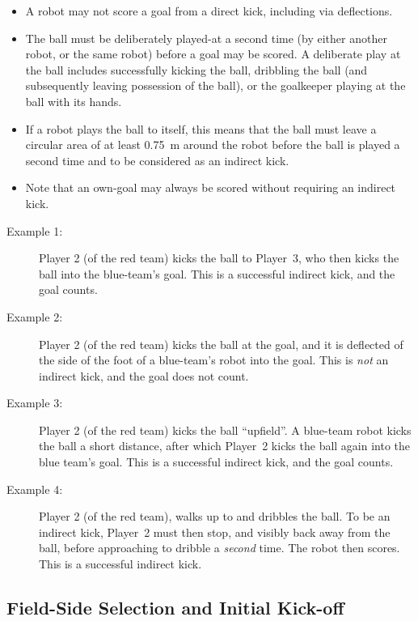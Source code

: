 \begin{itemize}
  \item A robot may not score a goal from a direct kick, including via deflections.
  \item The ball must be deliberately played-at a second time (by either another robot, or the same robot) before a goal may be scored.
    A deliberate play at the ball includes successfully kicking the ball, dribbling the ball (and subsequently leaving possession of the ball), or the goalkeeper playing at the ball with its hands.
  \item If a robot plays the ball to itself, this means that the ball must leave a circular area of at least \qty{0.75}{\metre} around the robot before the ball is played a second time and to be considered as an indirect kick.
  \item Note that an own-goal may always be scored without requiring an indirect kick.
\end{itemize}

\begin{description}
  \item[Example 1:] Player 2 (of the red team) kicks the ball to Player~3, who then kicks the ball into the blue-team's goal.
    This is a successful indirect kick, and the goal counts.
  \item[Example 2:] Player 2 (of the red team) kicks the ball at the goal, and it is deflected of the side of the foot of a blue-team's robot into the goal.
    This is \textit{not} an indirect kick, and the goal does not count.
  \item[Example 3:] Player 2 (of the red team) kicks the ball ``upfield''.
    A blue-team robot kicks the ball a short distance, after which Player~2 kicks the ball again into the blue team's goal.
    This is a successful indirect kick, and the goal counts.
  \item[Example 4:] Player 2 (of the red team), walks up to and dribbles the ball.
    To be an indirect kick, Player~2 must then stop, and visibly back away from the ball, before approaching to dribble a \textit{second} time.
    The robot then scores.
    This is a successful indirect kick.
\end{description}

\subsection{Field-Side Selection and Initial Kick-off}
\label{sec:field_side_and_initial_kickoff}

